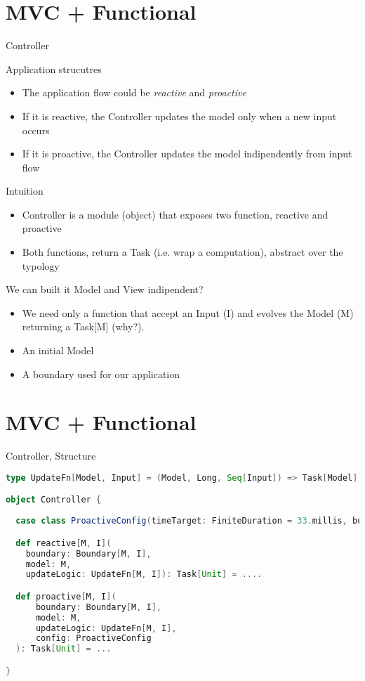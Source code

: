 \documentclass[presentation]{beamer}
\begin{document}
\section{MVC + Functional}
\begin{frame}[fragile]{Controller}

\begin{block}{Application strucutres}
  \begin{itemize}
    \item The application flow could be \emph{reactive} and \emph{proactive}
    \item If it is reactive, the Controller updates the model only when a new input occurs
    \item If it is proactive, the Controller updates the model indipendently from input flow
  \end{itemize}
\end{block}

\begin{block}{Intuition}
\begin{itemize}
  \item Controller is a module (object) that exposes two function, reactive and proactive
  \item Both functions, return a Task (i.e. wrap a computation), abstract over the typology
\end{itemize}
\end{block}
\begin{block}{We can built it Model and View indipendent?}
\end{block}
\begin{itemize}
  \item We need only a function that accept an Input (I) and evolves the Model (M) returning a Task[M] (why?).
  \item An initial Model
  \item A boundary used for our application
\end{itemize}
\end{frame}


\section{MVC + Functional}
\begin{frame}[fragile]{Controller, Structure}
\begin{lstlisting}[language=Scala]
type UpdateFn[Model, Input] = (Model, Long, Seq[Input]) => Task[Model]

object Controller {
  
  case class ProactiveConfig(timeTarget: FiniteDuration = 33.millis, bufferSize: Int = 5)

  def reactive[M, I](
    boundary: Boundary[M, I], 
    model: M, 
    updateLogic: UpdateFn[M, I]): Task[Unit] = ....

  def proactive[M, I](
      boundary: Boundary[M, I],
      model: M,
      updateLogic: UpdateFn[M, I],
      config: ProactiveConfig
  ): Task[Unit] = ...

}
\end{lstlisting}
\end{frame}
\end{document}
